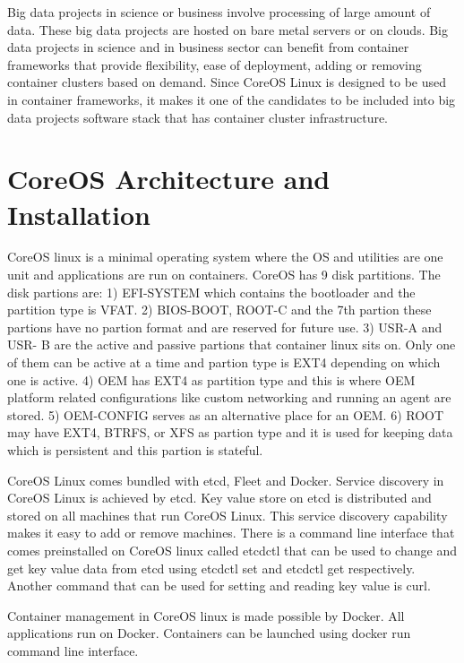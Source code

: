 \documentclass[9pt,twocolumn,twoside]{../../styles/osajnl}
\begin{document}
Big data projects in science or business involve processing of large
amount of data.  These big data projects are hosted on bare metal
servers or on clouds. Big data projects in science and in business
sector can benefit from container frameworks that provide flexibility,
ease of deployment, adding or removing container clusters based on
demand. \cite{julian2016containers} Since CoreOS Linux is designed to
be used in container frameworks, it makes it one of the candidates to
be included into big data projects software stack that has container
cluster infrastructure.

\section{CoreOS Architecture and Installation}

CoreOS linux is a minimal operating system where the OS and utilities
are one unit and applications are run on containers. CoreOS has 9 disk
partitions. The disk partions are: 1) EFI-SYSTEM which contains the
bootloader and the partition type is VFAT. 2) BIOS-BOOT, ROOT-C and
the 7th partion these partions have no partion format and are reserved
for future use. 3) USR-A and USR- B are the active and passive
partions that container linux sits on. Only one of them can be active
at a time and partion type is EXT4 depending on which one is
active. 4) OEM has EXT4 as partition type and this is where OEM
platform related configurations like custom networking and running an
agent are stored. 5) OEM-CONFIG serves as an alternative place for an
OEM. 6) ROOT may have EXT4, BTRFS, or XFS as partion type and it is
used for keeping data which is persistent and this partion is
stateful. \cite{www-core}

CoreOS Linux comes bundled with etcd, Fleet and Docker. Service
discovery in CoreOS Linux is achieved by etcd. Key value store on etcd
is distributed and stored on all machines that run CoreOS Linux. This
service discovery capability makes it easy to add or remove
machines. There is a command line interface that comes preinstalled on
CoreOS linux called etcdctl that can be used to change and get key
value data from etcd using etcdctl set and etcdctl get
respectively. Another command that can be used for setting and reading key
value is curl.

Container management in CoreOS linux is made possible by Docker.  All
applications run on Docker. Containers can be launched using docker
run command line interface.
\end{document}
